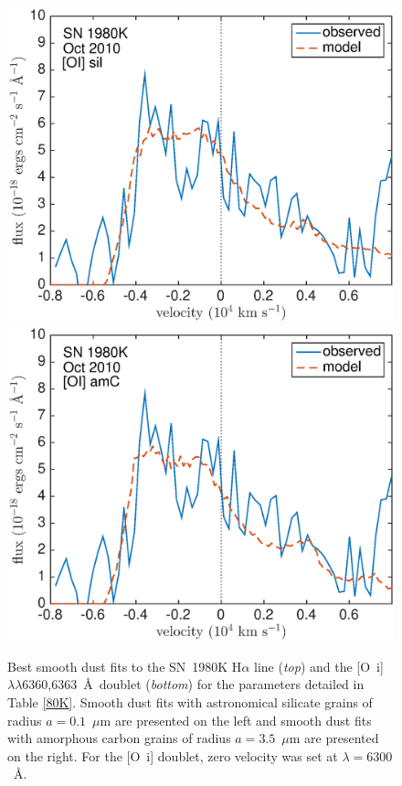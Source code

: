 {\begin{figure}[!t]
\includegraphics[scale=0.4,clip=true, trim=20 0 40 20]{chapters/chapter6/figs/80K/smooth/OI}
\includegraphics[scale=0.4,clip=true, trim=20 0 40 20]{chapters/chapter6/figs/80K/smooth/OI_amC}
\caption{Best smooth dust fits to the SN~1980K H$\alpha$ line ({\em top})  and the  [O~{\sc i}]$\lambda\lambda$6360,6363~\AA\ doublet ({\em bottom}) for the parameters detailed in Table \ref{80K}.  Smooth dust fits with astronomical silicate grains of radius $a=0.1$~$\mu$m are presented on the left and smooth dust fits with amorphous carbon grains of radius $a=3.5$~$\mu$m are presented on the right.  For the [O~{\sc i}] doublet, zero velocity was set at $\lambda=6300$~\AA.}
\label{80K_smooth}
\end{figure}

}


